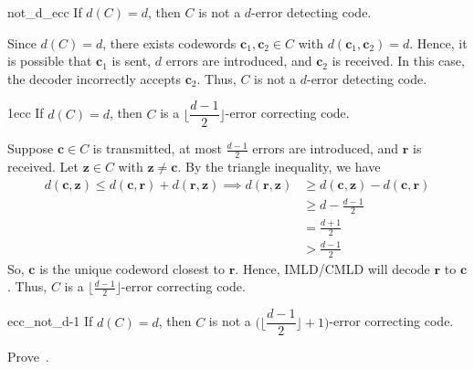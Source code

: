 \begin{Theorem}{}{not_d_ecc}
    If $ d(C)=d $, then $ C $ is not a $ d $-error detecting code.
\end{Theorem}

\begin{Proof}{}{}
    Since $ d(C)=d $, there exists codewords $ \symbf{c}_1,\symbf{c}_2\in C $
    with $ d(\symbf{c}_1,\symbf{c}_2)=d $. Hence, it is possible that
    $ \symbf{c}_1 $ is sent, $ d $ errors are introduced, and $ \symbf{c}_2 $
    is received. In this case, the decoder incorrectly accepts
    $ \symbf{c}_2 $. Thus, $ C $ is not a $ d $-error detecting code.
\end{Proof}

\begin{Theorem}{}{1ecc}
    If $ d(C)=d $, then $ C $ is a $ \biggr\lfloor \dfrac{d-1}{2}\biggl\rfloor $-error
    correcting code.
\end{Theorem}

\begin{Proof}{}{}
    Suppose $ \symbf{c}\in C $ is transmitted, at most $ \frac{d-1}{2}  $ errors
    are introduced, and $ \symbf{r} $ is received.
    Let $ \symbf{z}\in C $ with $ \symbf{z}\neq \symbf{c} $.
    By the triangle inequality, we have
    \begin{align*}
        d(\symbf{c},\symbf{z})\leqslant d(\symbf{c},\symbf{r})+d(\symbf{r},\symbf{z})\implies
        d(\symbf{r},\symbf{z})
         & \geqslant d(\symbf{c},\symbf{z})-d(\symbf{c},\symbf{r}) \\
         & \geqslant d-\frac{d-1}{2}                               \\
         & =\frac{d+1}{2}                                          \\
         & >\frac{d-1}{2}
    \end{align*}
    So, $ \symbf{c} $ is the unique codeword closest to $ \symbf{r} $. Hence, IMLD/CMLD
    will decode $ \symbf{r} $ to $ \symbf{c} $. Thus, $ C $ is a
    $ \bigl\lfloor \frac{d-1}{2} \bigr\rfloor $-error correcting code.
\end{Proof}

\begin{Theorem}{}{ecc_not_d-1}
    If $ d(C)=d $, then $ C $ is not a $ \biggl(\biggr\lfloor \dfrac{d-1}{2}\biggl\rfloor +1 \biggr) $-error correcting code.
\end{Theorem}

\begin{Exercise}{}{}
    Prove~.
\end{Exercise}

